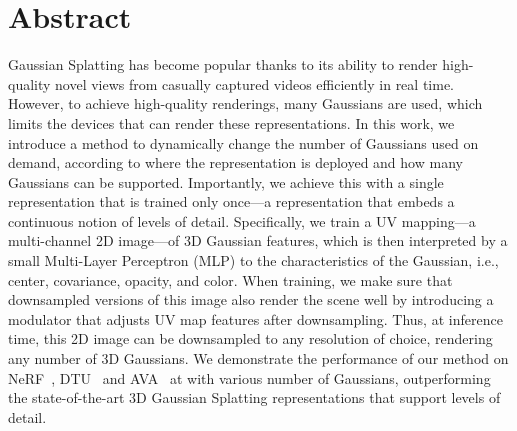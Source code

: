 \section{Abstract}
  \label{sec:clog-abstract}
  Gaussian Splatting has become popular thanks to its ability to render
  high-quality novel views from casually captured videos efficiently in real
  time.
  However, to achieve high-quality renderings, many Gaussians are used, which
  limits the devices that can render these representations.
  In this work, we introduce a method to dynamically change the number of
  Gaussians used on demand, according to where the representation is deployed
  and how many Gaussians can be supported.
  Importantly, we achieve this with a single representation that is trained
  only once---a representation that embeds a continuous notion of levels of
  detail.
  Specifically, we train a UV mapping---a multi-channel 2D image---of 3D
  Gaussian features, which is then interpreted by a small Multi-Layer
  Perceptron (MLP) to the characteristics of the Gaussian, i.e., center,
  covariance, opacity, and color.
  When training, we make sure that downsampled versions of this image also
  render the scene well by introducing a modulator that adjusts UV map
  features after downsampling.
  Thus, at inference time, this 2D image can be downsampled to any resolution
  of choice, rendering any number of 3D Gaussians.
  We demonstrate the performance of our method on
  NeRF~\cite{mildenhall2020nerf}, DTU~\cite{aanaes2016large} and
  AVA~\cite{martinez2024codec} at with various number of Gaussians,
  outperforming the state-of-the-art 3D Gaussian Splatting representations
  that support levels of detail.
